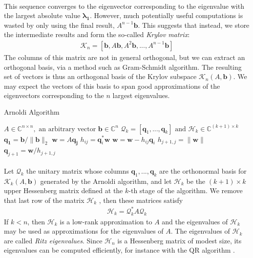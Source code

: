 \paragraph*{}
This sequence converges to the eigenvector corresponding to the eigenvalue with the largest absolute value $\boldsymbol{\lambda_1}$. However, much potentially useful computations is wasted by only using the final result, $A^{n-1}\mathbf{b}$. This suggests that instead, we store the intermediate results and form the so-called \textit{Krylov matrix}:
\begin{align}
    \mathcal{K}_n = [\mathbf{b}, A\mathbf{b},A^2\mathbf{b}, ..., A^{n-1}\mathbf{b}]
\end{align}
The columns of this matrix are not in general orthogonal, but we can extract an orthogonal basis, via a method such as Gram-Schmidt algorithm. The resulting set of vectors is thus an orthogonal basis of the Krylov subspace $\mathcal{K}_n(A,\mathbf{b})$. We may expect the vectors of this basis to span good approximations of the eigenvectors corresponding to the $n$ largest eigenvalues.

\begin{algorithm}
\caption{Arnoldi Algorithm}\label{alg:arnoldi}
\begin{algorithmic}[1]
\Require $A \in \mathbb{C}^{n\times n},\text{ an arbitrary vector } \mathbf{b} \in \mathbb{C}^n$
\Ensure $ \mathcal{Q}_k=[\mathbf{q}_1,...,\mathbf{q}_k] \text{ and } \mathcal{H}_k \in \mathbb{C}^{(k+1)\times k}$
\State $\mathbf{q_1} = \mathbf{b}/\lVert \mathbf{b} \rVert_2$
    \State $\mathbf{w} = A\mathbf{q_j}$ 
        \State $h_{ij}=\mathbf{q}_i^*\mathbf{w}$
        \State $\mathbf{w} = \mathbf{w}-h_{ij} \mathbf{q}_i$
    \EndFor
    \State $h_{j+1,j} = \lVert \mathbf{w} \rVert$
    \State $\mathbf{q}_{j+1} = \mathbf{w}/h_{j+1,j}$
\EndFor
\end{algorithmic}
\end{algorithm}

\paragraph*{}
Let $\mathcal{Q}_k$ the unitary matrix whose columns $\mathbf{q}_1,...,\mathbf{q}_k$ are the orthonormal basis for $\mathcal{K}_k(A,\mathbf{b})$ generated by the Arnoldi algorithm, and let $\mathcal{H}_k$ be the $(k+1)\times k$ upper Hessenberg matrix defined at the $k$-th stage of the algorithm. We remove that last row of the matrix $\mathcal{H}_k$ , then these matrices satisfy
\begin{align}\label{eq:arnoldi}
    \mathcal{H}_k = \mathcal{Q}_k^*A\mathcal{Q}_k
\end{align}
If  $k<n$, then $\mathcal{H}_k$ is a low-rank approximation to $A$ and the eigenvalues of $\mathcal{H}_k$ may be used as approximations for the eigenvalues of $A$. The eigenvalues of $\mathcal{H}_k$ are called \textit{Ritz eigenvalues}. Since $\mathcal{H}_n$ is a Hessenberg matrix of modest size, its eigenvalues can be computed efficiently, for instance with the QR algorithm \cite{Francis1961}.


